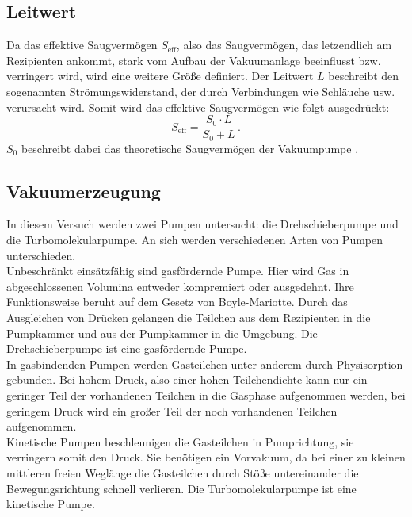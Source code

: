         \subsection{Leitwert}
        \label{subsec:leitwert}
            Da das effektive Saugvermögen $S_\text{eff}$, also das Saugvermögen, das letzendlich am Rezipienten ankommt, stark vom Aufbau der Vakuumanlage beeinflusst bzw. verringert wird, wird eine weitere Größe definiert.
            Der Leitwert $L$ beschreibt den sogenannten Strömungswiderstand, der durch Verbindungen wie Schläuche usw. verursacht wird.
            Somit wird das effektive Saugvermögen wie folgt ausgedrückt:
            \begin{equation*}
                S_\text{eff} = \frac{S_0 \cdot L}{S_0 + L} \, .
            \end{equation*}
            $S_0$ beschreibt dabei das theoretische Saugvermögen der Vakuumpumpe \cite{Pfeiffer}.


    \subsection{Vakuumerzeugung}
        In diesem Versuch werden zwei Pumpen untersucht: die Drehschieberpumpe und die Turbomolekularpumpe. An sich werden verschiedenen Arten von Pumpen unterschieden. \\
        Unbeschränkt einsätzfähig sind gasfördernde Pumpe. Hier wird Gas in abgeschlossenen Volumina entweder kompremiert oder ausgedehnt. Ihre Funktionsweise beruht auf dem Gesetz von 
        Boyle-Mariotte. Durch das Ausgleichen von Drücken gelangen die Teilchen aus dem Rezipienten in die Pumpkammer und aus der Pumpkammer in die Umgebung. Die Drehschieberpumpe ist eine 
        gasfördernde Pumpe. \\
        In gasbindenden Pumpen werden Gasteilchen unter anderem durch Physisorption gebunden. Bei hohem Druck, also einer hohen Teilchendichte kann nur ein geringer Teil der vorhandenen 
        Teilchen in die Gasphase aufgenommen werden, bei geringem Druck wird ein großer Teil der noch vorhandenen Teilchen aufgenommen. \\
        Kinetische Pumpen beschleunigen die Gasteilchen in Pumprichtung, sie verringern somit den Druck. 
        Sie benötigen ein Vorvakuum, da bei einer zu kleinen mittleren freien Weglänge die Gasteilchen durch Stöße untereinander die Bewegungsrichtung schnell verlieren. 
        Die Turbomolekularpumpe ist eine kinetische Pumpe.


